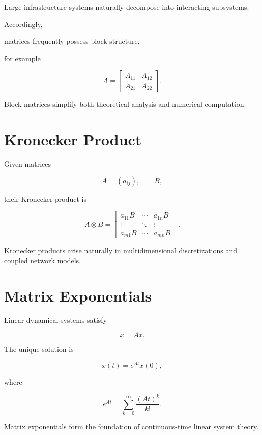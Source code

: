 \documentclass[11pt,fleqn]{book}
\numberwithin{equation}{chapter}
\theoremstyle{plain}
\theoremstyle{definition}
\theoremstyle{remark}
\begin{document}
Large infrastructure systems naturally decompose into interacting
subsystems.

Accordingly,

matrices frequently possess block structure,

for example

\[
A
=
\begin{bmatrix}
A_{11} & A_{12}\\
A_{21} & A_{22}
\end{bmatrix}.
\]

Block matrices simplify both theoretical analysis and numerical
computation.


\section{Kronecker Product}

Given matrices

\[
A
=
(a_{ij}),
\qquad
B,
\]

their Kronecker product is

\[
A\otimes B
=
\begin{bmatrix}
a_{11}B & \cdots & a_{1n}B\\
\vdots & \ddots & \vdots\\
a_{m1}B & \cdots & a_{mn}B
\end{bmatrix}.
\]

Kronecker products arise naturally in multidimensional discretizations
and coupled network models.


\section{Matrix Exponentials}

Linear dynamical systems satisfy

\[
\dot x
=
Ax.
\]

The unique solution is

\[
\boxed{
x(t)
=
e^{At}x(0),
}
\]

where

\[
e^{At}
=
\sum_{k=0}^{\infty}
\frac{(At)^k}{k!}.
\]

Matrix exponentials form the foundation of continuous-time linear system
theory.

\end{document}
